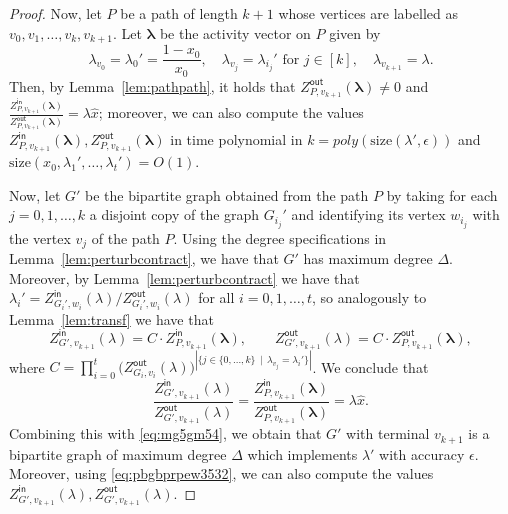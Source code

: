 \documentclass[11pt]{article}
\def\Zin{Z^{\mathsf{in}}}
\def\Zout{Z^{\mathsf{out}}}
\newcommand{\size}[1]{\mathrm{size}(#1)}
\def\lambdab{\ensuremath{\boldsymbol{\lambda}}}
\newcommand{\eps}{\epsilon}
\begin{document}
\begin{proof}
Now,  let $P$ be a path of length $k+1$ whose vertices are labelled as $v_0,v_1,\hdots,v_{k}, v_{k+1}$. Let $\lambdab$ be the activity vector on $P$ given by
\[\lambda_{v_0}=\lambda_{0}'=\frac{1-x_0}{x_0}, \quad \lambda_{v_j}=\lambda_{i_j}' \mbox{ for $j\in[k]$},  \quad \lambda_{v_{k+1}}=\lambda .\]
Then, by Lemma~\ref{lem:pathpath}, it holds that $\Zout_{P,v_{k+1}}(\lambdab)\neq 0$ and $\frac{\Zin_{P,v_{k+1}}(\lambdab)}{\Zout_{P,v_{k+1}}(\lambdab)}=\lambda \hat{x}$; moreover, we can also compute the values $\Zin_{P,v_{k+1}}(\lambdab),\Zout_{P,v_{k+1}}(\lambdab)$ in time polynomial in $k=poly(\size{\lambda',\eps})$ and $\size{x_0,\lambda_1',\hdots,\lambda_t'}=O(1)$. 

Now, let $G'$ be the bipartite graph obtained from the path $P$ by taking for each $j=0,1,\hdots,k$ a disjoint copy of the graph $G_{i_j}'$ and identifying its vertex $w_{i_j}$ with the vertex $v_j$ of the path $P$. Using the degree specifications in Lemma~\ref{lem:perturbcontract}, we have that $G'$ has maximum degree $\Delta$. Moreover, by Lemma~\ref{lem:perturbcontract} we have that $\lambda_i'=\Zin_{G_i',w_i}(\lambda)/\Zout_{G_i',w_i}(\lambda)$ for all $i=0,1,\hdots,t$, so analogously to  Lemma~\ref{lem:transf} we have that
\begin{equation}\label{eq:pbgbprpew3532}
\Zin_{G',v_{k+1}}(\lambda)= C\cdot \Zin_{P,v_{k+1}}(\lambdab),\qquad \Zout_{G',v_{k+1}}(\lambda)=C\cdot \Zout_{P,v_{k+1}}(\lambdab),
\end{equation}
where $C=\prod^t_{i=0}\big(\Zout_{G_i,v_i}(\lambda)\big)^{|\{j\in\{0,\hdots, k\}\,\mid\, \lambda_{v_j}=\lambda_i'\}|}$. We conclude that
\[\frac{\Zin_{G',v_{k+1}}(\lambda)}{\Zout_{G',v_{k+1}}(\lambda)}=\frac{\Zin_{P,v_{k+1}}(\lambdab)}{\Zout_{P,v_{k+1}}(\lambdab)}=\lambda \hat{x}.\]
Combining this with \eqref{eq:mg5gm54}, we obtain that $G'$ with terminal $v_{k+1}$ is a bipartite graph of maximum degree $\Delta$ which implements $\lambda'$ with accuracy $\epsilon$. Moreover, using \eqref{eq:pbgbprpew3532}, we can also compute the values $\Zin_{G',v_{k+1}}(\lambda),\Zout_{G',v_{k+1}}(\lambda)$.
\end{proof}
















\end{document}
